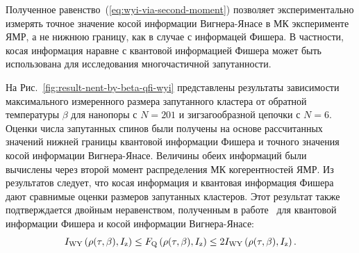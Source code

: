 Полученное равенство~(\ref{eq:wyi-via-second-moment}) позволяет экспериментально измерять точное значение
косой информации Вигнера-Янасе в МК эксперименте ЯМР,
а не нижнюю границу, как в случае с информацей Фишера.
В частности, косая информация наравне с квантовой информацией Фишера
может быть использована для исследования многочастичной запутанности.

На Рис.~\ref{fig:result-nent-by-beta-qfi-wyi} представлены результаты зависимости максимального измеренного размера запутанного кластера от обратной температуры $\beta$ для нанопоры с $N=201$ и зигзагообразной цепочки с $N=6$.
Оценки числа запутанных спинов были получены на основе рассчитанных значений нижней границы квантовой информации Фишера и точного значения косой информации Вигнера-Янасе.
Величины обеих информаций были вычислены через второй момент распределения МК когерентностей ЯМР.
Из результатов следует,
что косая информация и квантовая информация Фишера дают сравнимые оценки размеров запутанных кластеров.
Этот результат также подтверждается двойным неравенством, полученным в работе~\cite{Luo2003pamc} для
квантовой информации Фишера и косой информации Вигнера-Янасе:
%
\begin{equation} \label{eq:qfi-wyi-inequality}
  I_\mathrm{WY}\left( \rho(\tau,\beta), I_\mathrm{z} \right)
  \leq F_\mathrm{Q} \left( \rho(\tau,\beta), I_\mathrm{z} \right)
  \leq 2I_\mathrm{WY}\left( \rho(\tau,\beta), I_\mathrm{z} \right).
\end{equation}